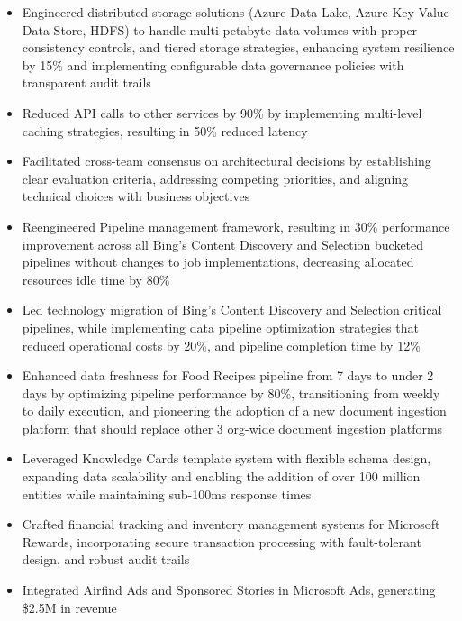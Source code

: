 \begin{itemize}
    \item \small{Engineered distributed storage solutions (Azure Data Lake, Azure Key-Value Data Store, HDFS) to handle multi-petabyte data volumes with proper consistency controls, and tiered storage strategies, enhancing system resilience by 15\% and implementing configurable data governance policies with transparent audit trails}

    \item \small{Reduced API calls to other services by 90\% by implementing multi-level caching strategies, resulting in 50\% reduced latency}

    \item \small{Facilitated cross-team consensus on architectural decisions by establishing clear evaluation criteria, addressing competing priorities, and aligning technical choices with business objectives}

    \item \small{Reengineered Pipeline management framework, resulting in 30\% performance improvement across all Bing's Content Discovery and Selection bucketed pipelines without changes to job implementations, decreasing allocated resources idle time by 80\%}

    \item \small{Led technology migration of Bing's Content Discovery and Selection critical pipelines, while implementing data pipeline optimization strategies that reduced operational costs by 20\%, and pipeline completion time by 12\%}

    \item \small{Enhanced data freshness for Food Recipes pipeline from 7 days to under 2 days by optimizing pipeline performance by 80\%, transitioning from weekly to daily execution, and pioneering the adoption of a new document ingestion platform that should replace other 3 org-wide document ingestion platforms}

    \item \small{Leveraged Knowledge Cards template system with flexible schema design, expanding data scalability and enabling the addition of over 100 million entities while maintaining sub-100ms response times}

    \item \small{Crafted financial tracking and inventory management systems for Microsoft Rewards, incorporating secure transaction processing with fault-tolerant design, and robust audit trails}

    \item \small{Integrated Airfind Ads and Sponsored Stories in Microsoft Ads, generating \$2.5M in revenue}


\end{itemize}
